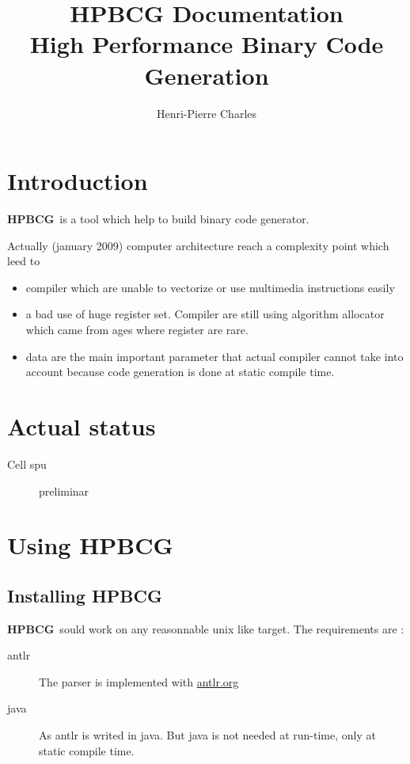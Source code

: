 \documentclass{article}
\title{HPBCG Documentation\\
High Performance Binary Code Generation}
\author{Henri-Pierre Charles}
\newcommand{\hpbcg}{\textbf{HPBCG}\ }
\begin{document}
\maketitle

\section{Introduction}

\hpbcg is a tool which help to build binary code generator.

Actually (january 2009) computer architecture reach a complexity
point which leed to
\begin{itemize}
\item compiler which are unable to vectorize or use multimedia
  instructions easily
\item a bad use of huge register set. Compiler are still using
  algorithm allocator which came from ages where register are rare.
\item data are the main important parameter that actual compiler
  cannot take into account because code generation is done at static
  compile time.
\end{itemize}

\section{Actual status}

\begin{description}
\item[Cell spu] preliminar
\end{description}

\section{Using \hpbcg}

\subsection{Installing \hpbcg}

\hpbcg sould work on any reasonnable unix like target. The requirements
are :
\begin{description}
\item[antlr] The parser is implemented with \url{antlr.org}
\item[java] As antlr is writed in java. But java is not needed at
  run-time, only at static compile time.
\end{description}
\end{document}
